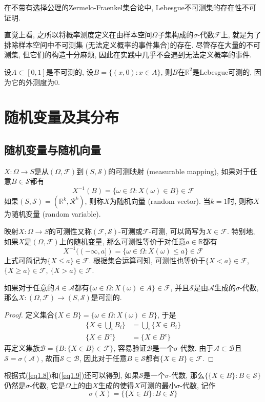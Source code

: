 \documentclass[cn, 12pt, math=mtpro2, bibstyle=apa, blue, twocol]{elegantbook}
\newcommand{\F}{\mathcal{F}}
\newcommand{\R}{\mathbb{R}}
\newcommand{\SE}{\mathcal{S}}
\begin{document}
\begin{remark}
在不带有选择公理的Zermelo-Fraenkel集合论中, Lebesgue不可测集的存在性不可证明.

直觉上看, 之所以将概率测度定义在由样本空间$\Omega$子集构成的$\sigma$-代数$\F$上, 就是为了排除样本空间中不可测集 (无法定义概率的事件集合)的存在. 尽管存在大量的不可测集, 但它们的构造十分麻烦, 因此在实践中几乎不会遇到无法定义概率的事件.
\end{remark}
\begin{example}
设$A\subset [0,1]$是不可测的, 设$B=\{(x,0): x\in A\}$, 则$B$在$\R^2$是Lebesgue可测的, 因为它的外测度为0.
\end{example}

\section{随机变量及其分布}
\subsection{随机变量与随机向量}
\begin{definition}
$X:\Omega\to S$是从$(\Omega,\F)$到$(S,\SE)$的可测映射 (measurable mapping), 如果对于任意$B\in\SE$都有
$$X^{-1}(B)=\{\omega\in\Omega: X(\omega)\in B\}\in \F$$
如果$(S,\SE)=(\R^k,\mathcal{R}^k)$, 则称$X$为随机向量 (random vector). 当$k=1$时, 则称$X$为随机变量 (random variable).
\end{definition}

映射$X:\Omega\to S$的可测性又称$(\F,\SE)$-可测或$\F$-可测, 可以简写为$X\in\F$. 特别地, 如果$X$是$(\Omega,\F)$上的随机变量, 那么可测性等价于对任意$a\in\R$都有
$$X^{-1}((-\infty,a])=\{\omega\in\Omega: X(\omega)\leq a\}\in\F$$
上式可简记为$\{X\leq a\}\in \F$. 根据集合运算可知, 可测性也等价于$\{X<a\}\in\F$, $\{X\geq a\}\in\F$, $\{X>a\}\in\F$.

\begin{theorem}\label{thm:thm1.5}
  如果对于任意的$A\in\mathcal{A}$都有$\{\omega\in\Omega:X(\omega)\in A\}\in\F$, 并且$\SE$是由$\mathcal{A}$生成的$\sigma$-代数, 那么$X:(\Omega,\F)\to (S,\SE)$是可测的.
\end{theorem}
\begin{proof}
  定义集合$\{X\in B\}=\{\omega\in\Omega: X(\omega)\in B\}$, 于是
  \begin{align}
  \{X\in\textstyle\bigcup_i B_i\}&=\textstyle \bigcup_i\{X\in B_i\} \label{eq1.8} \\
  \textstyle \{X\in B^c\}&=\{X\in B^c\} \label{eq1.9}
  \end{align}
  再定义集族$\mathcal{B}=\{B: \{X\in B\}\in\F\}$, 容易验证$\mathcal{B}$是一个$\sigma$-代数. 由于$\mathcal{A}\subset \mathcal{B}$且$\SE=\sigma(\mathcal{A})$, 故而$\SE\subset \mathcal{B}$, 因此对于任意$B\in\SE$都有$\{X\in B\}\in\F$.
\end{proof}
根据式(\ref{eq1.8})和(\ref{eq1.9})还可以得到, 如果$\SE$是一个$\sigma$-代数, 那么$\{\{X\in B\}:B\in\SE\}$仍然是$\sigma$-代数, 它是$\Omega$上的由$X$生成的使得$X$可测的最小$\sigma$-代数, 记作
$$\sigma(X)=\{\{X\in B\}:B\in\SE\}$$
\end{document}
